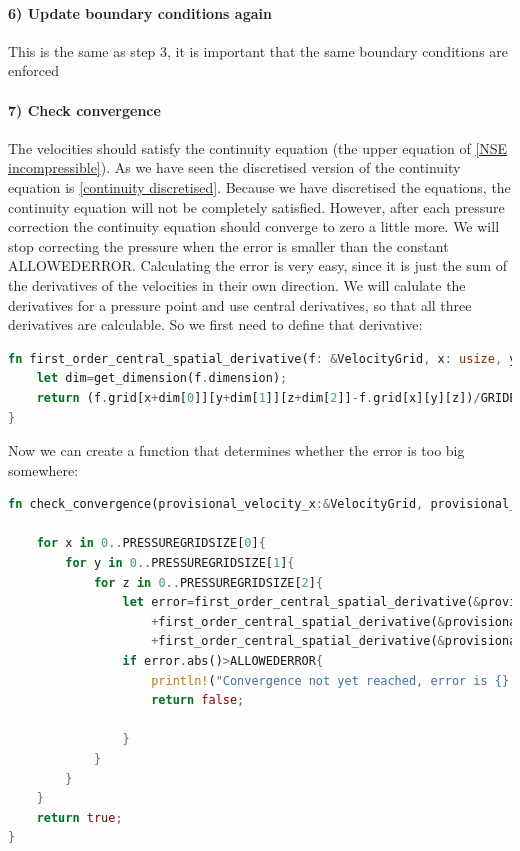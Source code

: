 \documentclass{article}
\begin{document}
\paragraph{6) Update boundary conditions again}
This is the same as step 3, it is important that the same boundary conditions are enforced
\paragraph{7) Check convergence}
The velocities should satisfy the continuity equation (the upper equation of \ref{NSE incompressible}). As we have seen the discretised version of the continuity equation is \ref{continuity discretised}. Because we have discretised the equations, the continuity equation will not be completely satisfied. However, after each pressure correction the continuity equation should converge to zero a little more. We will stop correcting the pressure when the error is smaller than the constant ALLOWEDERROR. Calculating the error is very easy, since it is just the sum of the derivatives of the velocities in their own direction. We will calulate the derivatives for a pressure point and use central derivatives, so that all three derivatives are calculable. So we first need to define that derivative:

\begin{lstlisting}[language=Rust, style=boxed, breaklines=true]
fn first_order_central_spatial_derivative(f: &VelocityGrid, x: usize, y: usize, z:usize)->f32{//practically identical to first_order_forward_spatial_derivative, but for clarity we keep it.
    let dim=get_dimension(f.dimension);
    return (f.grid[x+dim[0]][y+dim[1]][z+dim[2]]-f.grid[x][y][z])/GRIDELEMENTSCALE;
}
\end{lstlisting}
Now we can create a function that determines whether the error is too big somewhere:
\begin{lstlisting}[language=Rust, style=boxed, breaklines=true]
fn check_convergence(provisional_velocity_x:&VelocityGrid, provisional_velocity_y: &VelocityGrid, provisional_velocity_z: &VelocityGrid)->bool{
    
    for x in 0..PRESSUREGRIDSIZE[0]{
        for y in 0..PRESSUREGRIDSIZE[1]{
            for z in 0..PRESSUREGRIDSIZE[2]{
                let error=first_order_central_spatial_derivative(&provisional_velocity_x, x, y, z)
                    +first_order_central_spatial_derivative(&provisional_velocity_y, x, y, z)
                    +first_order_central_spatial_derivative(&provisional_velocity_z, x, y, z);    
                if error.abs()>ALLOWEDERROR{
                    println!("Convergence not yet reached, error is {} at ({}, {}, {})", error, x, y, z );
                    return false;

                }
            }
        }
    } 
    return true;
}
\end{lstlisting}
\end{document}
